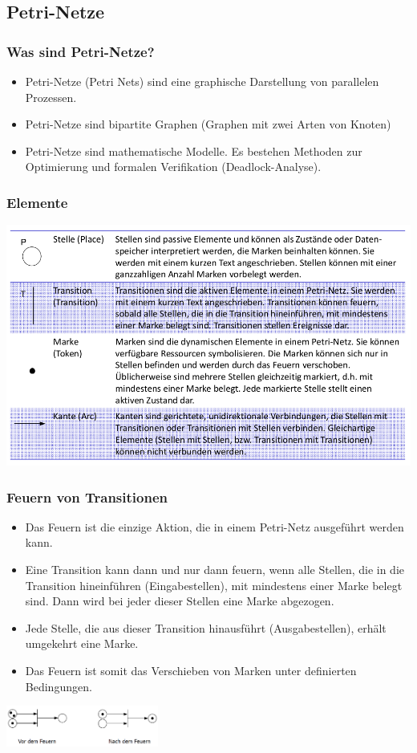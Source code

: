 \subsection{Petri-Netze}
\subsubsection{Was sind Petri-Netze?}
\begin{itemize}
\item Petri-Netze (Petri Nets) sind eine graphische Darstellung von parallelen Prozessen.
\item Petri-Netze sind bipartite Graphen (Graphen mit zwei Arten von Knoten)
\item Petri-Netze sind mathematische Modelle. Es bestehen Methoden zur
Optimierung und formalen Verifikation (Deadlock-Analyse).
\end{itemize}
\subsubsection{Elemente}
\includegraphics[width=15cm]{images/Concurrency/PetriNetzeElemente}

\subsubsection{Feuern von Transitionen}
\begin{itemize}
\item Das Feuern ist die einzige Aktion, die in einem Petri-Netz ausgeführt werden kann.
\item Eine Transition kann dann und nur dann feuern, wenn alle Stellen, die in die Transition hineinführen (Eingabestellen), mit mindestens einer Marke belegt sind. Dann wird bei jeder dieser Stellen eine Marke abgezogen.
\item Jede Stelle, die aus
dieser Transition hinausführt (Ausgabestellen), erhält umgekehrt eine Marke.
\item Das Feuern ist somit das Verschieben von Marken unter definierten Bedingungen.
\end{itemize}
\includegraphics[width=5cm]{images/Concurrency/Petri1}

